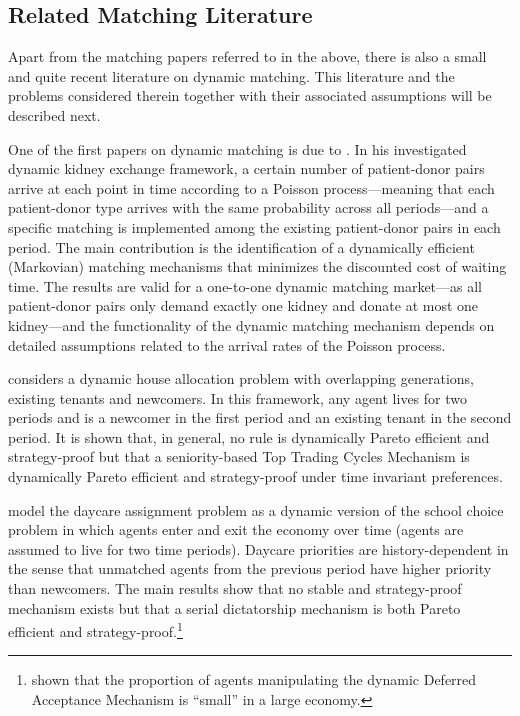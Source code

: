 \documentclass[12pt,fleqn]{article}
\begin{document}
\subsection{Related Matching Literature}\label{SEC:literature}
Apart from the matching papers referred to in the above, there is also a small and quite recent literature on dynamic matching. This literature and the problems considered therein together with their associated assumptions will be described next.

One of the first papers on dynamic matching is due to \citet{bib:Unver}. In his investigated dynamic kidney exchange framework, a certain number of patient-donor pairs arrive at each point in time according to a Poisson process---meaning that each patient-donor type arrives with the same probability across all periods---and a specific matching is implemented among the existing patient-donor pairs in each period. The main contribution is the identification of a dynamically efficient (Markovian) matching mechanisms that minimizes the discounted cost of waiting time. The results are valid for a one-to-one dynamic matching market---as all patient-donor pairs only demand exactly one kidney and donate at most one kidney---and the functionality of the dynamic matching mechanism depends on detailed assumptions related to the arrival rates of the Poisson process.

\citet{bib:Kurino} considers a dynamic house allocation problem with overlapping generations, existing tenants and newcomers. In this framework, any agent lives for two periods and is a newcomer in the first period and an existing tenant in the second period. It is shown that, in general, no rule is dynamically Pareto efficient and strategy-proof but that a seniority-based Top Trading Cycles Mechanism is dynamically Pareto efficient and strategy-proof under time invariant preferences.

\citet{bib:KennesEtAl2014} model the daycare assignment problem as a dynamic version of the school choice problem in which agents enter and exit the economy over time (agents are assumed to live for two time periods). Daycare priorities are history-dependent in the sense that unmatched agents from the previous period have higher priority than newcomers. The main results show that no stable and strategy-proof mechanism exists but that a serial dictatorship mechanism is both Pareto efficient and strategy-proof.\footnote{\citet{bib:KennesEtAl2015} shown that the proportion of agents manipulating the dynamic Deferred Acceptance Mechanism is ``small'' in a large economy.}
\end{document}
